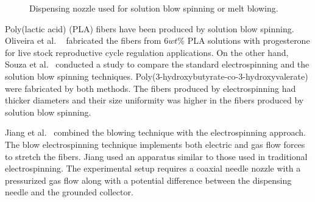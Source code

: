 \documentclass[5p,,preprint,12pt,twocolumn]{elsarticle}
\makeatletter
\def\fixFloatSize#1{}%
\makeatother
\begin{document}
\bgroup
\fixFloatSize{images/87246522-4cf1-491f-a45f-cda541854d72-uimg_blow_es.png}
\begin{figure}[!htbp]
\centering \makeatletter{}
\makeatother 
\caption{{Dispensing nozzle used for solution blow spinning or melt blowing. \unskip~\protect\cite{527120:13538056}}}
\label{f-92361290d8c3}
\end{figure}
\egroup
Poly(lactic acid) (PLA) fibers have been produced by solution blow spinning. Oliveira et al. \unskip~\cite{527120:13539278} fabricated the fibers from $6 wt\% $ PLA solutions with progesterone for live stock reproductive cycle regulation applications. On the other hand, Souza et al.\unskip~\cite{527120:13538056} conducted a study to compare the standard electrospinning and the solution blow spinning techniques. Poly(3-hydroxybutyrate-co-3-hydroxyvalerate) were fabricated by both methods. The fibers produced by electrospinning had thicker diameters and their size uniformity was higher in the fibers produced by solution blow spinning.

Jiang et al.\unskip~\cite{527120:13554126} combined the blowing technique with the electrospinning approach. The blow electrospinning technique implements both electric and gas flow forces to stretch the fibers. Jiang used an apparatus similar to those used in traditional electrospinning. The experimental setup requires a coaxial needle nozzle with a pressurized gas flow along with a potential difference between the dispensing needle and the grounded collector. 
\end{document}

